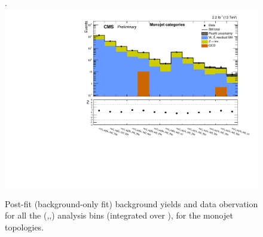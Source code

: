 

\clearpage
\begin{landscape}
  \begin{center}
    \begin{figure}[h!]
      \caption{Post-fit (background-only fit) background yields and data obervation for all the (\njet,\nb,\scalht) analysis bins (integrated over \MHT), for the monojet topologies. \label{fig:summaryPlot_fit_b_Monojet}}.
      \includegraphics[width=0.8\linewidth]{AN-15-004/trunk/figures/postFitResults/summaryPlots/summaryPlot_fit_b_Monojet}
    \end{figure}
  \end{center}
\end{landscape}

